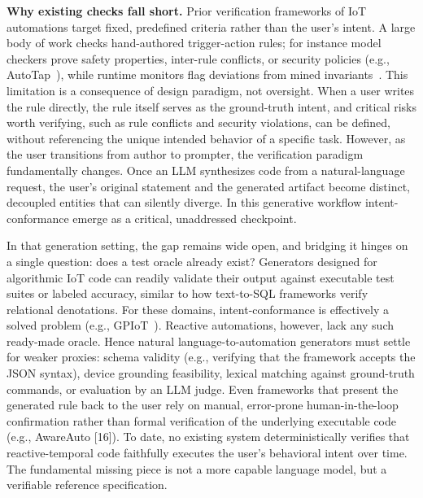 \documentclass[sigconf,nonacm,anonymous,review]{acmart}
\begin{document}
\textbf{Why existing checks fall short.} %
Prior verification frameworks of IoT automations target fixed, predefined criteria rather than the user's intent. A large body of work checks hand-authored trigger-action rules; for instance model checkers prove safety properties, inter-rule conflicts, or security policies (e.g., AutoTap~\cite{autotap}), while runtime monitors flag deviations from mined invariants~\cite{hawatcher}. This limitation is a consequence of design paradigm, not oversight. When a user writes the rule directly, the rule itself serves as %
the ground-truth intent, and critical risks worth verifying, such as rule conflicts and security violations, can be defined, without referencing the unique intended behavior of a specific task. %
However, as the user transitions from author to prompter, the verification paradigm fundamentally changes. Once an LLM synthesizes code from a natural-language request, the user’s original statement and the generated artifact become distinct, decoupled entities that can silently diverge. In this generative workflow intent-conformance emerge as a critical, unaddressed checkpoint.

In that generation setting, the gap remains wide open, and bridging it hinges on a single question: %
does a test oracle already exist? Generators designed for algorithmic IoT code can readily validate their output against executable test suites or labeled accuracy, similar to how text-to-SQL frameworks verify relational denotations. For these domains, intent-conformance is effectively a solved problem (e.g., GPIoT~\cite{gpiot}). Reactive automations, however, lack any such ready-made oracle. Hence natural language-to-automation generators must settle for weaker proxies: schema validity (e.g., verifying that the framework accepts the JSON syntax), device grounding feasibility, lexical matching against ground-truth commands, or evaluation by an LLM judge. Even frameworks that present the generated rule back to the user rely on manual, error-prone human-in-the-loop confirmation rather than formal verification of the underlying executable code (e.g., AwareAuto [16]). To date, no existing system deterministically verifies that reactive-temporal code faithfully executes the user's behavioral intent over time. The fundamental missing piece is not a more capable language model, but a verifiable reference specification. %
\end{document}
